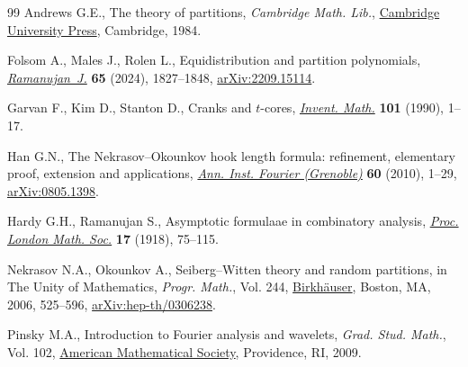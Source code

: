\documentclass[11pt]{article}
\numberwithin{equation}{section}
\begin{document}
\begin{thebibliography}{99}
Andrews G.E., The theory of partitions, \textit{Cambridge Math. Lib.}, \href{https://doi.org/10.1017/CBO9780511608650}{Cambridge
 University Press}, Cambridge, 1984.

Folsom A., Males J., Rolen L., Equidistribution and partition polynomials,
 \href{https://doi.org/10.1007/s11139-023-00762-w}{\textit{Ramanujan~J.}} \textbf{65} (2024), 1827--1848, \href{https://arxiv.org/abs/2209.15114}{arXiv:2209.15114}.

Garvan F., Kim D., Stanton D., Cranks and {$t$}-cores, \href{https://doi.org/10.1007/BF01231493}{\textit{Invent. Math.}}
 \textbf{101} (1990), 1--17.

Han G.N., The {N}ekrasov--{O}kounkov hook length formula: refinement,
 elementary proof, extension and applications, \href{https://doi.org/10.5802/aif.2515}{\textit{Ann. Inst. Fourier
 (Grenoble)}} \textbf{60} (2010), 1--29, \href{https://arxiv.org/abs/0805.1398}{arXiv:0805.1398}.

Hardy G.H., Ramanujan S., Asymptotic formulaae in combinatory analysis,
 \href{https://doi.org/10.1112/plms/s2-17.1.75}{\textit{Proc. London Math. Soc.}} \textbf{17} (1918), 75--115.

Nekrasov N.A., Okounkov A., Seiberg--{W}itten theory and random partitions, in
 The Unity of Mathematics, \textit{Progr. Math.}, Vol. 244, \href{https://doi.org/10.1007/0-8176-4467-9_15}{Birkh\"auser},
 Boston, MA, 2006, 525--596, \href{https://arxiv.org/abs/hep-th/0306238}{arXiv:hep-th/0306238}.

Pinsky M.A., Introduction to {F}ourier analysis and wavelets, \textit{Grad.
 Stud. Math.}, Vol. 102, \href{https://doi.org/10.1090/gsm/102}{American Mathematical Society}, Providence, RI, 2009.

\end{thebibliography}
\end{document}
